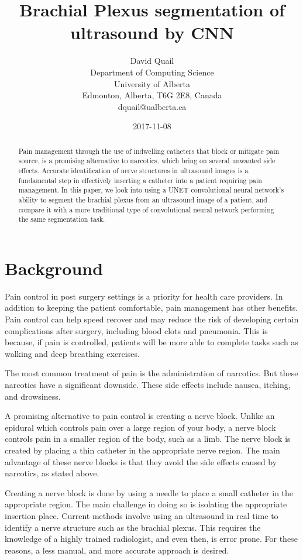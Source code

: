 \documentclass[letterpaper]{article}
\title{Brachial Plexus segmentation of ultrasound by CNN}
\date{2017-11-08}
\author{David Quail\\
Department of Computing Science \\ University of Alberta \\
Edmonton, Alberta, T6G 2E8, Canada \\
dquail@ualberta.ca}
\begin{document}
\maketitle
\begin{abstract}
Pain management through the use of indwelling catheters that block or mitigate pain source, is a promising alternative to narcotics, which bring on several unwanted side effects. Accurate identification of nerve structures in ultrasound images is a fundamental step in effectively inserting a catheter into a patient requiring pain management. In this paper, we look into using a UNET \cite{ronneberger2015u} convolutional neural network's ability to segment the brachial plexus from an ultrasound image of a patient, and compare it with a more traditional type of convolutional neural network performing the same segmentation task. 
\end{abstract}
    
\section{Background}

Pain control in post surgery settings is a priority for health care providers. In addition to keeping the patient comfortable, pain management has other benefits. Pain control can help speed recover and may reduce the risk of developing certain complications after surgery, including blood clots and pneumonia. This is because, if pain is controlled, patients will be more able to complete tasks such as walking and deep breathing exercises.

The most common treatment of pain is the administration of narcotics. But these narcotics have a significant downside. These side effects include nausea, itching, and drowsiness. 

A promising alternative to pain control is creating a nerve block. Unlike an epidural which controls pain over a large region of your body, a nerve block controls pain in a smaller region of the body, such as a limb. The nerve block is created by placing a thin catheter in the appropriate nerve region. The main advantage of these nerve blocks is that they avoid the side effects caused by narcotics, as stated above.

Creating a nerve block is done by using a needle to place a small catheter in the appropriate region. The main challenge in doing so is isolating the appropriate insertion place. Current methods involve using an ultrasound in real time to identify a nerve structure such as the brachial plexus. This requires the knowledge of a highly trained radiologist, and even then, is error prone. For these reasons, a less manual, and more accurate approach is desired. 
\end{document}
